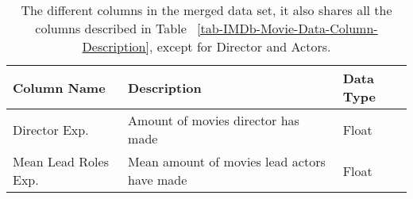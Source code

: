     \begin{table}[H]
        \centering
        \begin{tabular}{lp{9cm}l}
            \toprule
            Column Name          & Description                                 & Data Type \\
            \midrule
            Director Exp.        & Amount of movies director has made          & Float     \\
            Mean Lead Roles Exp. & Mean amount of movies lead actors have made & Float     \\
            \bottomrule
        \end{tabular}
        \caption[short]{The different columns in the merged data set,
            it also shares all the columns described in Table
            ~\ref{tab-IMDb-Movie-Data-Column-Description},
            except for Director and Actors.}\label{tab-merged-data-column-description}
    \end{table}

